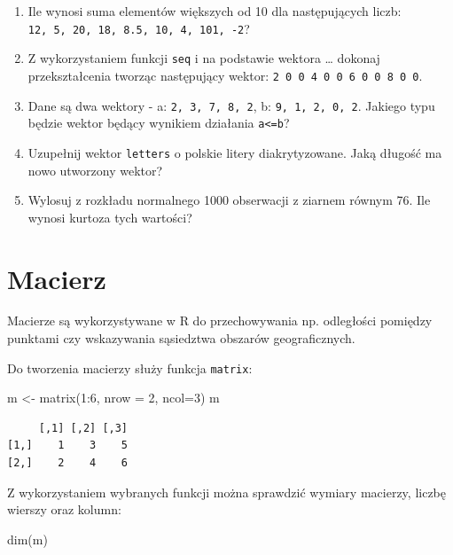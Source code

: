 \documentclass[
  letterpaper,
  DIV=11,
  numbers=noendperiod]{scrreprt}
\newenvironment{Shaded}{\begin{snugshade}}{\end{snugshade}}
\newcommand{\AttributeTok}[1]{\textcolor[rgb]{0.40,0.45,0.13}{#1}}
\newcommand{\DecValTok}[1]{\textcolor[rgb]{0.68,0.00,0.00}{#1}}
\newcommand{\FunctionTok}[1]{\textcolor[rgb]{0.28,0.35,0.67}{#1}}
\newcommand{\NormalTok}[1]{\textcolor[rgb]{0.00,0.23,0.31}{#1}}
\newcommand{\OtherTok}[1]{\textcolor[rgb]{0.00,0.23,0.31}{#1}}
\newcommand{\SpecialCharTok}[1]{\textcolor[rgb]{0.37,0.37,0.37}{#1}}
\providecommand{\tightlist}{%
  \setlength{\itemsep}{0pt}\setlength{\parskip}{0pt}}\usepackage{longtable,booktabs,array}
\begin{document}
\begin{enumerate}
\def\labelenumi{\arabic{enumi}.}
\tightlist
\item
  Ile wynosi suma elementów większych od 10 dla następujących liczb:
  \texttt{12,\ 5,\ 20,\ 18,\ 8.5,\ 10,\ 4,\ 101,\ -2}?
\item
  Z wykorzystaniem funkcji \texttt{seq} i na podstawie wektora \ldots{}
  dokonaj przekształcenia tworząc następujący wektor:
  \texttt{2\ 0\ 0\ 4\ 0\ 0\ 6\ 0\ 0\ 8\ 0\ 0}.
\item
  Dane są dwa wektory - a: \texttt{2,\ 3,\ 7,\ 8,\ 2}, b:
  \texttt{9,\ 1,\ 2,\ 0,\ 2}. Jakiego typu będzie wektor będący wynikiem
  działania \texttt{a\textless{}=b}?
\item
  Uzupełnij wektor \texttt{letters} o polskie litery diakrytyzowane.
  Jaką długość ma nowo utworzony wektor?
\item
  Wylosuj z rozkładu normalnego 1000 obserwacji z ziarnem równym 76. Ile
  wynosi kurtoza tych wartości?
\end{enumerate}

\hypertarget{macierz}{%
\section{Macierz}\label{macierz}}

Macierze są wykorzystywane w R do przechowywania np. odległości pomiędzy
punktami czy wskazywania sąsiedztwa obszarów geograficznych.

Do tworzenia macierzy służy funkcja \texttt{matrix}:

\begin{Shaded}
\begin{Highlighting}[]
\NormalTok{m }\OtherTok{\textless{}{-}} \FunctionTok{matrix}\NormalTok{(}\DecValTok{1}\SpecialCharTok{:}\DecValTok{6}\NormalTok{, }\AttributeTok{nrow =} \DecValTok{2}\NormalTok{, }\AttributeTok{ncol=}\DecValTok{3}\NormalTok{)}
\NormalTok{m}
\end{Highlighting}
\end{Shaded}

\begin{verbatim}
     [,1] [,2] [,3]
[1,]    1    3    5
[2,]    2    4    6
\end{verbatim}

Z wykorzystaniem wybranych funkcji można sprawdzić wymiary macierzy,
liczbę wierszy oraz kolumn:

\begin{Shaded}
\begin{Highlighting}[]
\FunctionTok{dim}\NormalTok{(m)}
\end{Highlighting}
\end{Shaded}
\end{document}
